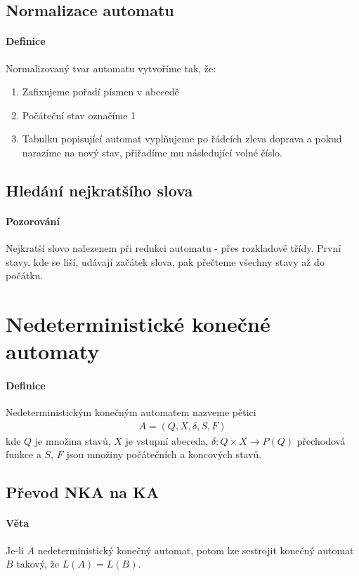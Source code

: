 \documentclass[a4paper,12pt,titlepage]{article}
\begin{document}
\subsection{Normalizace automatu}
\setcounter{equation}{0}
\paragraph{Definice}
Normalizovaný tvar automatu vytvoříme tak, že:
\begin{enumerate}
	\item Zafixujeme pořadí písmen v abecedě
	\item Počáteční stav označíme 1
	\item Tabulku popisující automat vyplňujeme po řádcích zleva doprava a pokud
	narazíme na nový stav, přiřadíme mu následující volné číslo.
\end{enumerate}
\subsection{Hledání nejkratšího slova}
\setcounter{equation}{0}
\paragraph{Pozorování}
Nejkratší slovo nalezenem při redukci automatu - přes rozkladové třídy. První
stavy, kde se liší, udávají začátek slova, pak přečteme všechny stavy až do
počátku.


\section{Nedeterministické konečné automaty}
\setcounter{equation}{0}
\paragraph{Definice}
Nedeterministickým konečným automatem nazveme pětici
\begin{align}
	A = (Q, X, \delta, S, F)
\end{align}
kde $Q$ je množina stavů, $X$ je vstupní abeceda, $\delta: Q \times X \to P(Q)$
přechodová funkce a $S$, $F$ jsou množiny počátečních a koncových stavů.
\subsection{Převod NKA na KA}
\setcounter{equation}{0}
\paragraph{Věta}
Je-li $A$ nedeterministický konečný automat, potom lze sestrojit konečný automat
$B$ takový, že $L(A) = L(B)$.
\end{document}
